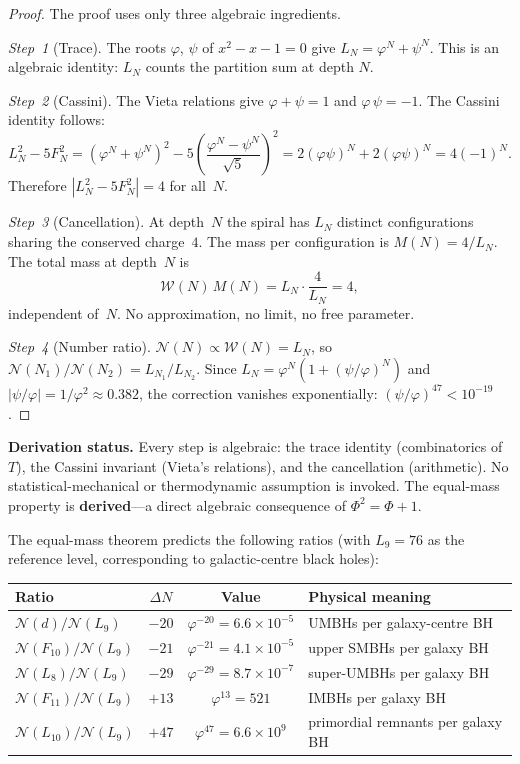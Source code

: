 \documentclass[12pt,a4paper]{article}
\begin{document}
\begin{proof}
The proof uses only three algebraic ingredients.

\emph{Step~1} (Trace).  
The roots $\varphi$, $\psi$ of $x^2 - x - 1 = 0$ give $L_N = \varphi^N + \psi^N$.  This is an algebraic identity: $L_N$ counts the partition sum at depth $N$.

\emph{Step~2} (Cassini).  
The Vieta relations give $\varphi + \psi = 1$ and $\varphi\,\psi = -1$.  The Cassini identity follows:
\[
L_N^2 - 5F_N^2 = (\varphi^N + \psi^N)^2 - 5\!\left(\frac{\varphi^N - \psi^N}{\sqrt{5}}\right)^{\!2}
= 2(\varphi\psi)^N + 2(\varphi\psi)^N = 4(-1)^N.
\]
Therefore $|L_N^2 - 5F_N^2| = 4$ for all~$N$.

\emph{Step~3} (Cancellation).  
At depth~$N$ the spiral has $L_N$ distinct configurations sharing the conserved charge~$4$.  The mass per configuration is $M(N) = 4/L_N$.  The total mass at depth~$N$ is
\[
\mathcal{W}(N)\,M(N) = L_N \cdot \frac{4}{L_N} = 4,
\]
independent of~$N$.  No approximation, no limit, no free parameter.

\emph{Step~4} (Number ratio).
$\mathcal{N}(N) \propto \mathcal{W}(N) = L_N$, so $\mathcal{N}(N_1)/\mathcal{N}(N_2) = L_{N_1}/L_{N_2}$.  Since $L_N = \varphi^N(1 + (\psi/\varphi)^N)$ and $|\psi/\varphi| = 1/\varphi^2 \approx 0.382$, the correction vanishes exponentially: $(\psi/\varphi)^{47} < 10^{-19}$.
\end{proof}

\noindent\textbf{Derivation status.}\; Every step is algebraic: the trace identity (combinatorics of~$T$), the Cassini invariant (Vieta's relations), and the cancellation (arithmetic).  No statistical-mechanical or thermodynamic assumption is invoked.  The equal-mass property is \textbf{derived}---a direct algebraic consequence of $\Phi^2 = \Phi + 1$.

\medskip

The equal-mass theorem predicts the following ratios (with $L_9 = 76$ as the reference level, corresponding to galactic-centre black holes):

\begin{center}\small
\begin{tabular}{l|c|c|l}
Ratio & $\Delta N$ & Value & Physical meaning \\
\hline
$\mathcal{N}(d)/\mathcal{N}(L_9)$ & $-20$ & $\varphi^{-20} = 6.6 \times 10^{-5}$ & UMBHs per galaxy-centre BH \\
$\mathcal{N}(F_{10})/\mathcal{N}(L_9)$ & $-21$ & $\varphi^{-21} = 4.1 \times 10^{-5}$ & upper SMBHs per galaxy BH \\
$\mathcal{N}(L_8)/\mathcal{N}(L_9)$ & $-29$ & $\varphi^{-29} = 8.7 \times 10^{-7}$ & super-UMBHs per galaxy BH \\
$\mathcal{N}(F_{11})/\mathcal{N}(L_9)$ & $+13$ & $\varphi^{13} = 521$ & IMBHs per galaxy BH \\
$\mathcal{N}(L_{10})/\mathcal{N}(L_9)$ & $+47$ & $\varphi^{47} = 6.6 \times 10^{9}$ & primordial remnants per galaxy BH \\
\end{tabular}
\end{center}
\end{document}
